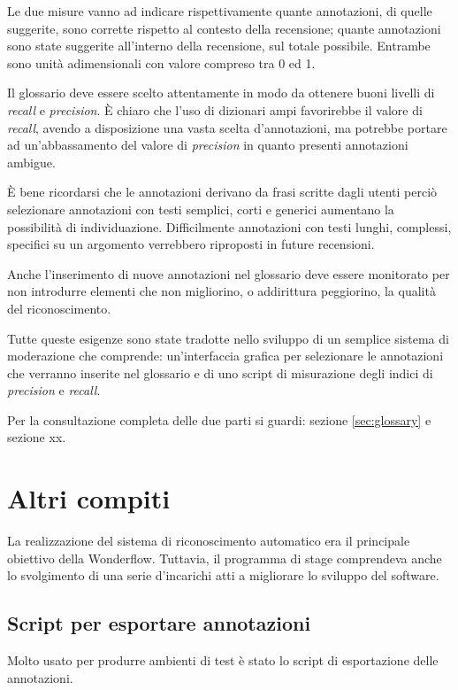 Le due misure vanno ad indicare rispettivamente quante annotazioni, di quelle
suggerite, sono corrette rispetto al contesto della recensione; quante
annotazioni sono state suggerite all'interno della recensione, sul totale
possibile. Entrambe sono unità adimensionali con valore compreso tra 0 ed 1.

Il glossario deve essere scelto attentamente in modo da ottenere buoni livelli
di \textit{recall} e \textit{precision}. È chiaro che l'uso di dizionari ampi
favorirebbe il valore di \textit{recall}, avendo a disposizione una vasta scelta
d'annotazioni, ma potrebbe portare ad un'abbassamento del valore di
\textit{precision} in quanto presenti annotazioni ambigue.

È bene ricordarsi che le annotazioni derivano da frasi scritte dagli utenti
perciò selezionare annotazioni con testi semplici, corti e generici aumentano
la possibilità di individuazione. Difficilmente annotazioni con testi lunghi,
complessi, specifici su un argomento verrebbero riproposti in future recensioni.

Anche l'inserimento di nuove annotazioni nel glossario deve essere monitorato
per non introdurre elementi che non migliorino, o addirittura peggiorino, la
qualità del riconoscimento.

Tutte queste esigenze sono state tradotte nello sviluppo di un semplice sistema
di moderazione che comprende: un'interfaccia grafica per selezionare le
annotazioni che verranno inserite nel glossario e di uno \gls{script} di
misurazione degli indici di \textit{precision} e \textit{recall}.

Per la consultazione completa delle due parti si guardi: sezione
\ref{sec:glossary} e sezione xx.

\section{Altri compiti}
La realizzazione del sistema di riconoscimento automatico era il principale
obiettivo della Wonderflow. Tuttavia, il programma di stage comprendeva anche lo
svolgimento di una serie d'incarichi atti a migliorare lo sviluppo del software.

\subsection{Script per esportare annotazioni}
Molto usato per produrre ambienti di test è stato lo \gls{script} di
esportazione delle annotazioni.

